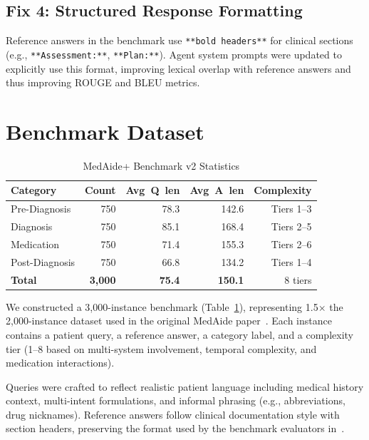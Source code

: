 \documentclass[conference]{IEEEtran}
\begin{document}
\subsection{Fix 4: Structured Response Formatting}
Reference answers in the benchmark use \texttt{**bold headers**} for clinical sections (e.g., \texttt{**Assessment:**}, \texttt{**Plan:**}). Agent system prompts were updated to explicitly use this format, improving lexical overlap with reference answers and thus improving ROUGE and BLEU metrics.

\section{Benchmark Dataset}
\label{sec:dataset}

\begin{table}[t]
\centering
\caption{MedAide+ Benchmark v2 Statistics}
\label{tab:dataset}
\begin{tabular}{lrrrr}
\toprule
\textbf{Category} & \textbf{Count} & \textbf{Avg~Q~len} & \textbf{Avg~A~len} & \textbf{Complexity} \\
\midrule
Pre-Diagnosis & 750 & 78.3 & 142.6 & Tiers 1--3 \\
Diagnosis & 750 & 85.1 & 168.4 & Tiers 2--5 \\
Medication & 750 & 71.4 & 155.3 & Tiers 2--6 \\
Post-Diagnosis & 750 & 66.8 & 134.2 & Tiers 1--4 \\
\midrule
\textbf{Total} & \textbf{3,000} & \textbf{75.4} & \textbf{150.1} & 8 tiers \\
\bottomrule
\end{tabular}
\end{table}

We constructed a 3,000-instance benchmark (Table~\ref{tab:dataset}), representing 1.5$\times$ the 2,000-instance dataset used in the original MedAide paper~\cite{yang2025medaide}. Each instance contains a patient query, a reference answer, a category label, and a complexity tier (1--8 based on multi-system involvement, temporal complexity, and medication interactions).

Queries were crafted to reflect realistic patient language including medical history context, multi-intent formulations, and informal phrasing (e.g., abbreviations, drug nicknames). Reference answers follow clinical documentation style with section headers, preserving the format used by the benchmark evaluators in~\cite{ke2022meddialog}.
\end{document}

